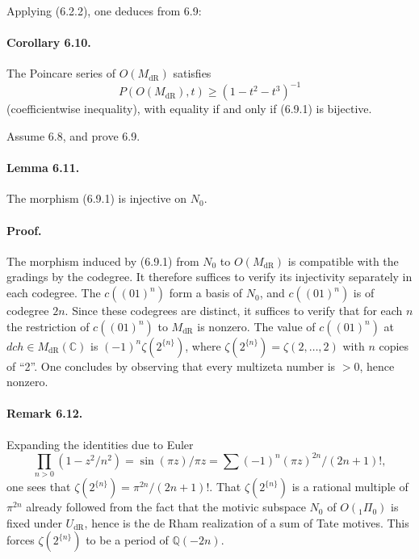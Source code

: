 \documentclass[11pt]{article}
\newcommand{\Q}{\mathbb Q}
\newcommand{\C}{\mathbb C}
\newcommand{\dR}{\mathrm{dR}}
\begin{document}
Applying (6.2.2), one deduces from 6.9:

\paragraph{Corollary 6.10.}
The Poincare series of $O(M_{\dR})$ satisfies
\begin{equation}
 P(O(M_{\dR}),t)\geq(1-t^2-t^3)^{-1}
\tag{6.10.1}
\end{equation}
(coefficientwise inequality), with equality if and only if (6.9.1) is bijective.

Assume 6.8, and prove 6.9.

\paragraph{Lemma 6.11.}
The morphism (6.9.1) is injective on $N_0$.

\paragraph{Proof.}
The morphism induced by (6.9.1) from $N_0$ to $O(M_{\dR})$ is compatible with the gradings by the codegree.
It therefore suffices to verify its injectivity separately in each codegree.
The $c((01)^n)$ form a basis of $N_0$, and $c((01)^n)$ is of codegree $2n$.
Since these codegrees are distinct, it suffices to verify that for each $n$ the restriction of $c((01)^n)$ to $M_{\dR}$ is nonzero.
The value of $c((01)^n)$ at $dch\in M_{\dR}(\C)$ is $(-1)^n\zeta(2^{\{n\}})$, where $\zeta(2^{\{n\}})=\zeta(2,\ldots,2)$ with $n$ copies of ``2''.
One concludes by observing that every multizeta number is $>0$, hence nonzero.

\paragraph{Remark 6.12.}
Expanding the identities due to Euler
\[
 \prod_{n>0}(1-z^2/n^2)=\sin(\pi z)/\pi z
 =\sum (-1)^n(\pi z)^{2n}/(2n+1)!,
\]
one sees that $\zeta(2^{\{n\}})=\pi^{2n}/(2n+1)!$.
That $\zeta(2^{\{n\}})$ is a rational multiple of $\pi^{2n}$ already followed from the fact that the motivic subspace $N_0$ of $O({}_1\Pi_0)$ is fixed under $U_{\dR}$, hence is the de Rham realization of a sum of Tate motives.
This forces $\zeta(2^{\{n\}})$ to be a period of $\Q(-2n)$.
\end{document}
